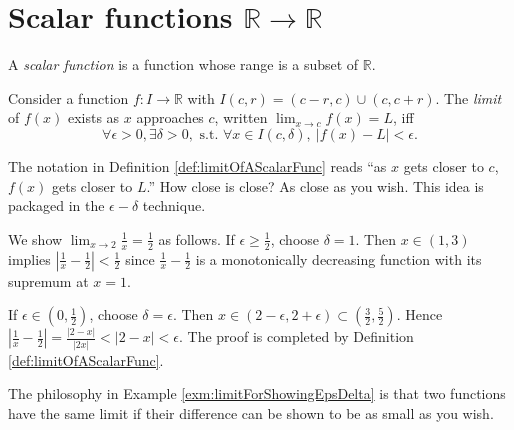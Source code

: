 \section{Scalar functions
  $\mathbb{R}\rightarrow\mathbb{R}$}
\label{sec:cont-funct-on-R}

\begin{defn}
  A \emph{scalar function} is a function
   whose range is a subset of $\mathbb{R}$.
\end{defn}

\begin{defn}
  \label{def:limitOfAScalarFunc}
  Consider a function $f: I\rightarrow \mathbb{R}$
   with $I(c,r)=(c-r,c)\cup (c,c+r)$.
  The \emph{limit} of $f(x)$  exists
   as $x$ approaches $c$, written
     $\lim_{x\rightarrow c} f(x) = L$,
  iff 
  \begin{equation}
 \forall \epsilon>0, \exists \delta>0, \text{ s.t. }
    \forall x\in I(c,\delta),\ |f(x)-L|<\epsilon.
  \end{equation}
\end{defn}

\begin{rem}
  The notation in Definition \ref{def:limitOfAScalarFunc}
  reads ``as $x$ gets closer to $c$,
 $f(x)$ gets closer to $L$.''
How close is close?
As close as you wish.
This idea is packaged in the $\epsilon-\delta$ technique.
\end{rem}

\begin{exm}
  \label{exm:limitForShowingEpsDelta}
   We show $\lim_{x\rightarrow 2}\frac{1}{x}= \frac{1}{2}$ as follows.
   If $\epsilon\ge \frac{1}{2}$,
   choose $\delta=1$.
   Then $x\in(1,3)$ implies
   $\left|\frac{1}{x}-\frac{1}{2}\right|<\frac{1}{2}$
   since $\frac{1}{x}-\frac{1}{2}$
   is a monotonically decreasing function
   with its supremum at $x=1$.

  If $\epsilon\in (0,\frac{1}{2})$,
   choose $\delta=\epsilon$.
  Then $x\in (2-\epsilon,2+\epsilon)\subset
  (\frac{3}{2},\frac{5}{2})$.
  Hence
  $\left|\frac{1}{x}-\frac{1}{2}\right|=\frac{|2-x|}{|2x|}<|2-x|<\epsilon$.
  The proof is completed by Definition \ref{def:limitOfAScalarFunc}.
\end{exm}

\begin{rem}
  The philosophy in Example \ref{exm:limitForShowingEpsDelta}
  is that two functions have the same limit
  if their difference can be shown to be as small as you wish.
\end{rem}

